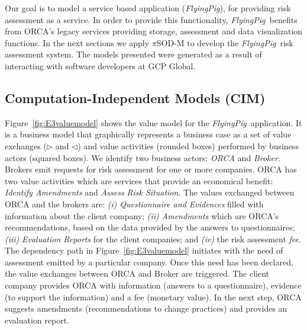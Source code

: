 \documentclass{singlecol-new}
\theoremstyle{TH}{
\newtheorem{lemma}{Lemma}
\newtheorem{theorem}[lemma]{Theorem}
\newtheorem{corrolary}[lemma]{Corrolary}
\newtheorem{conjecture}[lemma]{Conjecture}
\newtheorem{proposition}[lemma]{Proposition}
\newtheorem{claim}[lemma]{Claim}
\newtheorem{stheorem}[lemma]{Wrong Theorem}
\newtheorem{algorithm}{Algorithm}
}
\theoremstyle{THrm}{
\newtheorem{definition}{Definition}[section]
\newtheorem{question}{Question}[section]
\newtheorem{remark}{Remark}
\newtheorem{scheme}{Scheme}
}
\theoremstyle{THhit}{
\newtheorem{case}{Case}[section]
}
\theoremstyle{THhsl}{
\newtheorem{example}{Example}
}
\newcommand{\pisodm}[0]{$\pi$SOD-M\xspace}
\def\FlyingPig{\textsl{FlyingPig}\xspace}
\begin{document}
Our goal is to model a service based application (\FlyingPig), for providing risk assessment as a service.
In order to provide this functionality, \FlyingPig\ benefits from ORCA's legacy services providing storage, assessment and data visualization functions.
%
In the next sections we apply \pisodm to develop the \FlyingPig\ risk assessment system.
The models presented were generated as a result of interacting with software developers at GCP Global.



\subsection{Computation-Independent Models (CIM)}

Figure~\ref{fig:E3valuemodel} shows the value model for the \FlyingPig\ application.
It is a business model that graphically represents a business case as a set of value exchanges ($\triangleright$ and $\triangleleft$) and value activities (rounded boxes) performed by business actors (squared boxes).
We identify two business actors: \textsl{ORCA} and \textsl{Broker}.
Brokers emit requests for risk assessment for one or more companies.
ORCA has two value activities which are services that provide an economical benefit:  \textsl{Identify Amendments} and \textsl{Assess Risk Situation}.
The values exchanged between ORCA and the brokers are:
\textit{(i)} \textsl{Questionnaire and Evidences} filled with information about the client company;
\textit{(ii)} \textsl{Amendments} which are ORCA's rec\-om\-men\-da\-tions, based on the data provided by the answers to questionnaires;
\textit{(iii)} \textsl{Evaluation Reports} for the client companies;
and
\textit{(iv)} the risk assessment \textsl{fee}.
%
The dependency path in Figure~\ref{fig:E3valuemodel} initiates with the need of assessment emitted by a particular company.
Once this need has been declared, the value exchanges between ORCA and Broker are triggered.
The client company provides ORCA with information (answers to a questionnaire), evidence (to support the information) and a fee (monetary value).
In the next step, ORCA suggests amendments (recommendations to change practices) and provides an evaluation report.
\end{document}
